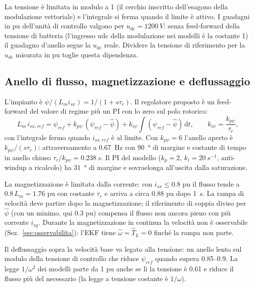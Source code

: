\documentclass[10pt,a4paper]{scrartcl}
\newcommand{\dif}{\mathrm{d}}
\newcommand{\taur}{\tau_r}
\begin{document}
\begin{onehalfspace}
La tensione è limitata in modulo a 1 (il cerchio inscritto dell'esagono della modulazione vettoriale) e l'integrale si ferma quando il limite è attivo. I guadagni in pu dell'unità di controllo valgono per $u_{dc} = \SI{1200}{V}$: senza feed-forward della tensione di batteria (l'ingresso udc della modulazione nei modelli è la costante 1) il guadagno d'anello segue la $u_{dc}$ reale. Dividere la tensione di riferimento per la $u_{dc}$ misurata in pu toglie questa dipendenza.

\subsection{Anello di flusso, magnetizzazione e deflussaggio}
\label{sec:anelloflusso}

L'impianto è $\psi/(L_m i_{sx}) = 1/(1 + s\taur)$. Il regolatore proposto è un feed-forward del valore di regime più un PI con lo zero sul polo rotorico:
\begin{equation}
L_m\,i_{sx,ref} = \psi_{ref} + k_{p\psi}\,(\psi_{ref} - \hat\psi) + k_{i\psi}\int(\psi_{ref} - \hat\psi)\,\dif t, \qquad k_{i\psi} = \frac{k_{p\psi}}{\taur},
\label{eq:pipsi}
\end{equation}
con l'integrale fermo quando $i_{sx,ref}$ è al limite. Con $k_{p\psi} = 6$ l'anello aperto è $k_{p\psi}/(s\taur)$: attraversamento a \SI{0.67}{Hz} con \SI{90}{\degree} di margine e costante di tempo in anello chiuso $\taur/k_{p\psi} = \SI{0.238}{s}$. Il PI del modello ($k_p = 2$, $k_i = \SI{20}{s^{-1}}$, anti-windup a ricalcolo) ha \SI{31}{\degree} di margine e sovraelonga all'uscita dalla saturazione.

La magnetizzazione è limitata dalla corrente: con $i_{sx} \le \num{0.8}$ pu il flusso tende a $\num{0.8}\,L_m = \num{1.76}$ pu con costante $\taur$ e arriva a circa \num{0.88} pu dopo \SI{1}{s}. La rampa di velocità deve partire dopo la magnetizzazione; il riferimento di coppia diviso per $\hat\psi$ (con un minimo, qui \num{0.3} pu) compensa il flusso non ancora pieno con più corrente $i_{sy}$. Durante la magnetizzazione in continua la velocità non è osservabile (Sez.~\ref{sec:osservabilita}): l'EKF tiene $\hat\omega = \hat T_L = 0$ finché la rampa non parte.

Il deflussaggio sopra la velocità base va legato alla tensione: un anello lento sul modulo della tensione di controllo che riduce $\psi_{ref}$ quando supera \numrange{0.85}{0.9}. La legge $1/\omega^2$ dei modelli parte da \num{1} pu anche se lì la tensione è \num{0.61} e riduce il flusso più del necessario (la legge a tensione costante è $1/\omega$).


\end{onehalfspace}
\end{document}
